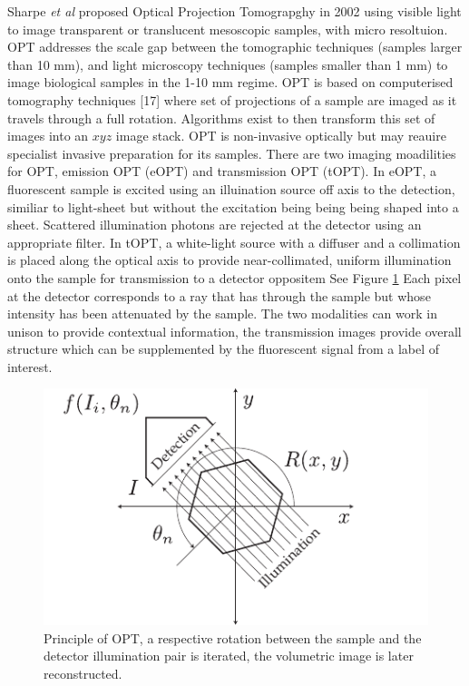 Sharpe \emph{et al} proposed Optical Projection Tomograpghy in 2002 \cite{sharpe_optical_2002}
using visible light to image transparent or translucent mesoscopic samples, with micro resoltuion.
OPT addresses the scale gap between the tomographic techniques (samples larger than 10 mm), and light microscopy techniques (samples smaller than 1 mm) to image biological samples in the 1-10 mm regime.
OPT is based on computerised tomography techniques [17] where set of projections of a sample are imaged as it travels through a full rotation.
Algorithms exist to then transform this set of images into an $xyz$ image stack.
OPT is non-invasive optically but may reauire specialist invasive preparation for its samples.
There are two imaging moadilities for OPT, emission OPT (eOPT) and transmission OPT (tOPT).
In eOPT, a fluorescent sample is excited using an illuination source off axis to the detection, similiar to light-sheet but without the excitation being being being shaped into a sheet.
Scattered illumination photons are rejected at the detector using an appropriate filter.
In tOPT, a white-light source with a diffuser and a collimation is placed along the optical axis to provide near-collimated, uniform illumination onto the sample for transmission to a detector oppositem See Figure \ref{fig:OPT_digram}%
Each pixel at the detector corresponds to a ray that has through the sample but whose intensity has been attenuated by the sample.
The two modalities can work in unison to provide contextual information, the transmission images provide overall structure which can be supplemented by the fluorescent signal from a label of interest.

\begin{figure}
  \centering
  \includegraphics{Chapters/flopt/Figs/PDF/OPT_digram}
  \caption{Principle of OPT, a respective rotation between the sample and the detector illumination pair is iterated, the volumetric image is later reconstructed.}
  \label{fig:OPT_digram}
\end{figure}

